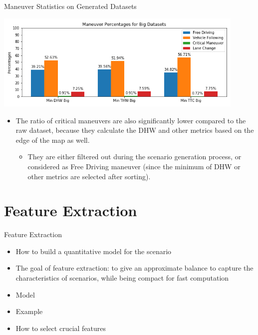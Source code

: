 \documentclass[shortpres]{beamer}
\begin{document}
\begin{frame}{Maneuver Statistics on Generated Datasets}	

\begin{center}
	\includegraphics[width=12cm]{big_datasets_maneuvers}
\end{center}

\begin{itemize}
\fontsize{8pt}{10pt}\selectfont\item The ratio of critical maneuvers are also significantly lower compared to the raw dataset, because they calculate the DHW and other metrics based on the edge of the map as well.
	\begin{itemize} 
		\fontsize{8pt}{10pt}\selectfont\item They are either filtered out during the scenario generation process, or considered as Free Driving maneuver (since the minimum of DHW or other metrics are selected after sorting).
	\end{itemize}
\end{itemize}

\end{frame}


\section{Feature Extraction}	

\begin{frame}{Feature Extraction}	

\begin{itemize} 
\item How to build a quantitative model for the scenario
\vfill \item The goal of feature extraction: to give an approximate balance to capture the characteristics of scenarios, while being compact for fast computation
\vfill \item Model
\vfill \item Example
\vfill \item How to select crucial features
\end{itemize}
\end{frame}
\end{document}
